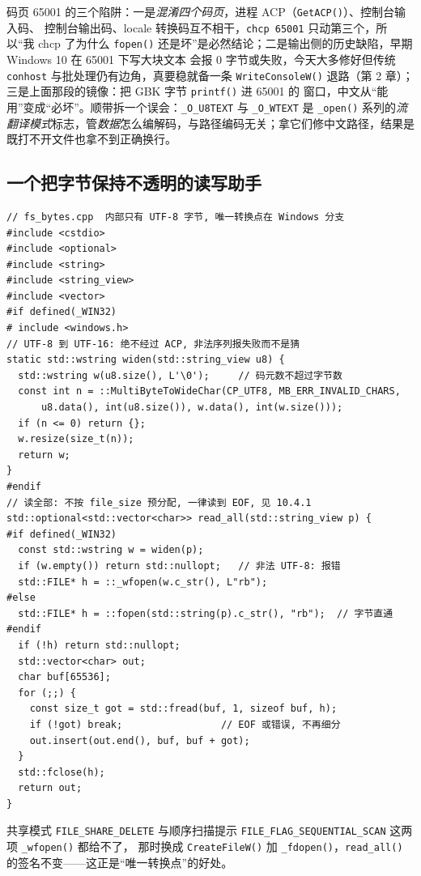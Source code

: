 \documentclass[12pt,a4paper,fontset=fandol]{ctexbook}
\newcommand{\Fn}[1]{\texttt{#1()}}
\newcommand{\Tp}[1]{\texttt{#1}}
\newcommand{\Bk}{\allowbreak}
\begin{document}
码页 65001 的三个陷阱：一是\emph{混淆四个码页}，进程 ACP（\Fn{GetACP}）、控制台输入码、
控制台输出码、locale 转换码互不相干，\Tp{chcp 65001} 只动第三个，所以``我 chcp 了为什么
\Fn{fopen} 还是坏''是必然结论；二是输出侧的历史缺陷，早期 Windows 10 在 65001 下写大块文本
会报 0 字节或失败，今天大多修好但传统 \Tp{conhost} 与批处理仍有边角，真要稳就备一条
\Fn{WriteConsoleW} 退路（第 2 章）；三是上面那段的镜像：把 GBK 字节 \Fn{printf} 进 65001 的
窗口，中文从``能用''变成``必坏''。顺带拆一个误会：\Tp{\_O\_U8TEXT} 与 \Tp{\_O\_WTEXT} 是
\Fn{\_open} 系列的\emph{流翻译模式}标志，管\emph{数据}怎么编解码，与路径编码无关；拿它们修中文路径，结果是既打不开文件也拿不到正确换行。

\subsection{一个把字节保持不透明的读写助手}

\begin{lstlisting}[caption={跨平台字节读写助手：只在边界转换一次（fs\_bytes.cpp）}]
// fs_bytes.cpp  内部只有 UTF-8 字节, 唯一转换点在 Windows 分支
#include <cstdio>
#include <optional>
#include <string>
#include <string_view>
#include <vector>
#if defined(_WIN32)
# include <windows.h>
// UTF-8 到 UTF-16: 绝不经过 ACP, 非法序列报失败而不是猜
static std::wstring widen(std::string_view u8) {
  std::wstring w(u8.size(), L'\0');     // 码元数不超过字节数
  const int n = ::MultiByteToWideChar(CP_UTF8, MB_ERR_INVALID_CHARS,
      u8.data(), int(u8.size()), w.data(), int(w.size()));
  if (n <= 0) return {};
  w.resize(size_t(n));
  return w;
}
#endif
// 读全部: 不按 file_size 预分配, 一律读到 EOF, 见 10.4.1
std::optional<std::vector<char>> read_all(std::string_view p) {
#if defined(_WIN32)
  const std::wstring w = widen(p);
  if (w.empty()) return std::nullopt;   // 非法 UTF-8: 报错
  std::FILE* h = ::_wfopen(w.c_str(), L"rb");
#else
  std::FILE* h = ::fopen(std::string(p).c_str(), "rb");  // 字节直通
#endif
  if (!h) return std::nullopt;
  std::vector<char> out;
  char buf[65536];
  for (;;) {
    const size_t got = std::fread(buf, 1, sizeof buf, h);
    if (!got) break;                 // EOF 或错误, 不再细分
    out.insert(out.end(), buf, buf + got);
  }
  std::fclose(h);
  return out;
}
\end{lstlisting}

共享模式 \Tp{FILE\_{\Bk}SHARE\_{\Bk}DELETE} 与顺序扫描提示
\Tp{FILE\_{\Bk}FLAG\_{\Bk}SEQUENTIAL\_{\Bk}SCAN} 这两项 \Fn{\_wfopen} 都给不了，
那时换成 \Fn{CreateFileW} 加 \Fn{\_fdopen}，\Fn{read\_all} 的签名不变——这正是``唯一转换点''的好处。
\end{document}
